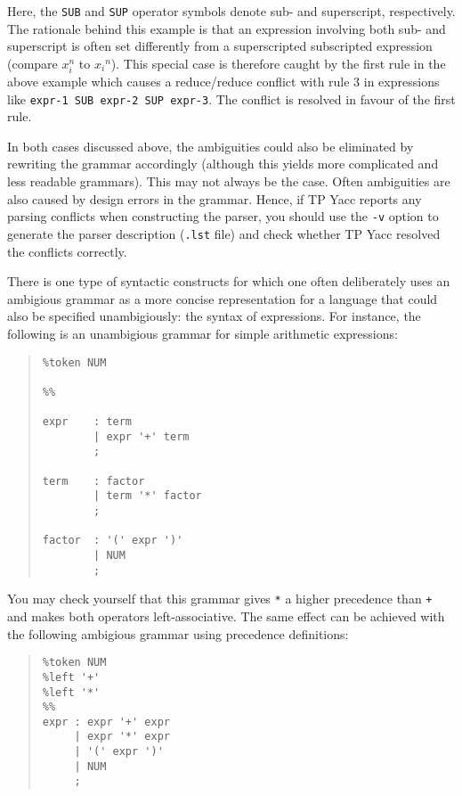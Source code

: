 Here, the \verb"SUB" and \verb"SUP" operator symbols denote sub- and
superscript, respectively. The rationale behind this example is that
an expression involving both sub- and superscript is often set differently
from a superscripted subscripted expression (compare $x_i^n$ to ${x_i}^n$).
This special case is therefore caught by the first rule in the above example
which causes a reduce/reduce conflict with rule 3 in expressions like
\verb"expr-1 SUB expr-2 SUP expr-3". The conflict is resolved in favour of
the first rule.

In both cases discussed above, the ambiguities could also be eliminated
by rewriting the grammar accordingly (although this yields more complicated
and less readable grammars). This may not always be the case. Often
ambiguities are also caused by design errors in the grammar. Hence, if
TP Yacc reports any parsing conflicts when constructing the parser, you
should use the \verb"-v" option to generate the parser description
(\verb".lst" file) and check whether TP Yacc resolved the conflicts correctly.

There is one type of syntactic constructs for which one often deliberately
uses an ambigious grammar as a more concise representation for a language
that could also be specified unambigiously: the syntax of expressions.
For instance, the following is an unambigious grammar for simple arithmetic
expressions:

\begin{quote}\begin{verbatim}
%token NUM

%%

expr    : term
        | expr '+' term
        ;

term    : factor
        | term '*' factor
        ;

factor  : '(' expr ')'
        | NUM
        ;
\end{verbatim}\end{quote}

You may check yourself that this grammar gives \verb"*" a higher precedence
than \verb"+" and makes both operators left-associative. The same effect can
be achieved with the following ambigious grammar using precedence definitions:

\begin{quote}\begin{verbatim}
%token NUM
%left '+'
%left '*'
%%
expr : expr '+' expr
     | expr '*' expr
     | '(' expr ')'
     | NUM
     ;
\end{verbatim}\end{quote}


